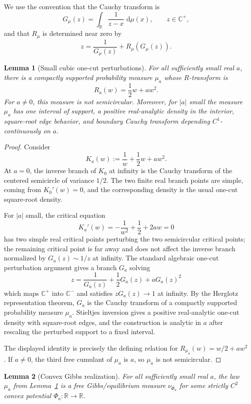 \documentclass[11pt]{article}
\newtheorem{lemma}{Lemma}
\newcommand{\R}{\mathbb R}
\newcommand{\C}{\mathbb C}
\newcommand{\dd}{\,\mathrm d}
\begin{document}
We use the convention that the Cauchy transform is
\[
  G_\mu(z)=\int_\R\frac{1}{z-x}\,\dd\mu(x),
  \qquad z\in\C^+,
\]
and that \(R_\mu\) is determined near zero by
\[
  z=\frac1{G_\mu(z)}+R_\mu(G_\mu(z)).
\]

\begin{lemma}[Small cubic one-cut perturbations]\label{lem:onecut}
For all sufficiently small real \(a\), there is a compactly supported
probability measure \(\mu_a\) whose \(R\)-transform is
\[
  R_a(w)=\frac12 w+a w^2.
\]
For \(a\ne0\), this measure is not semicircular. Moreover, for \(|a|\) small
the measure \(\mu_a\) has one interval of support, a positive real-analytic
density in the interior, square-root edge behavior, and boundary Cauchy
transform depending \(C^1\)-continuously on \(a\).
\end{lemma}

\begin{proof}
Consider
\[
  K_a(w):=\frac1w+\frac12 w+a w^2.
\]
At \(a=0\), the inverse branch of \(K_0\) at infinity is the Cauchy transform
of the centered semicircle of variance \(1/2\). The two finite real branch
points are simple, coming from \(K_0'(w)=0\), and the corresponding density is
the usual one-cut square-root density.

For \(|a|\) small, the critical equation
\[
  K_a'(w)=-\frac1{w^2}+\frac12+2aw=0
\]
has two simple real critical points perturbing the two semicircular critical
points; the remaining critical point is far away and does not affect the
inverse branch normalized by \(G_a(z)\sim 1/z\) at infinity. The standard
algebraic one-cut perturbation argument gives a branch \(G_a\) solving
\[
  z=\frac1{G_a(z)}+\frac12 G_a(z)+aG_a(z)^2
\]
which maps \(\C^+\) into \(\C^-\) and satisfies \(zG_a(z)\to1\) at infinity.
By the Herglotz representation theorem, \(G_a\) is the Cauchy transform of a
compactly supported probability measure \(\mu_a\). Stieltjes inversion gives a
positive real-analytic one-cut density with square-root edges, and the
construction is analytic in \(a\) after rescaling the perturbed support to a
fixed interval.

The displayed identity is precisely the defining relation for
\(R_{\mu_a}(w)=w/2+aw^2\). If \(a\ne0\), the third free cumulant of \(\mu_a\)
is \(a\), so \(\mu_a\) is not semicircular.
\end{proof}

\begin{lemma}[Convex Gibbs realization]\label{lem:gibbs}
For all sufficiently small real \(a\), the law \(\mu_a\) from
Lemma~\ref{lem:onecut} is a free Gibbs/equilibrium measure
\(\nu_{\Phi_a}\) for some strictly \(C^2\) convex potential
\(\Phi_a:\R\to\R\).
\end{lemma}
\end{document}
